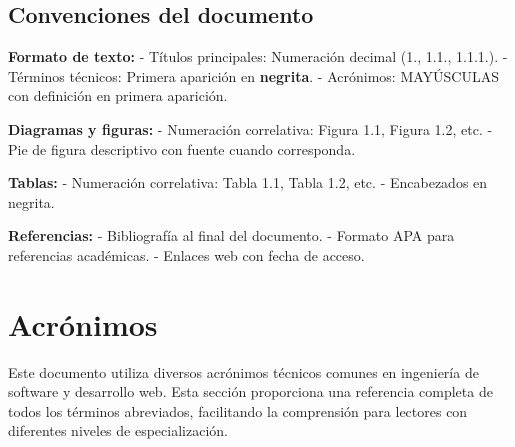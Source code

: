 \documentclass[12pt,a4paper,oneside]{report}
\begin{document}
\subsection{Convenciones del
documento}\label{convenciones-del-documento}

\textbf{Formato de texto:} - Títulos principales: Numeración decimal
(1., 1.1., 1.1.1.). - Términos técnicos: Primera aparición en
\textbf{negrita}. - Acrónimos: MAYÚSCULAS con definición en primera
aparición.

\textbf{Diagramas y figuras:} - Numeración correlativa: Figura 1.1,
Figura 1.2, etc. - Pie de figura descriptivo con fuente cuando
corresponda.

\textbf{Tablas:} - Numeración correlativa: Tabla 1.1, Tabla 1.2, etc. -
Encabezados en negrita.

\textbf{Referencias:} - Bibliografía al final del documento. - Formato
APA para referencias académicas. - Enlaces web con fecha de acceso.

\section{Acrónimos}\label{acruxf3nimos}

Este documento utiliza diversos acrónimos técnicos comunes en ingeniería de software y desarrollo web. Esta sección proporciona una referencia completa de todos los términos abreviados, facilitando la comprensión para lectores con diferentes niveles de especialización.
\end{document}
